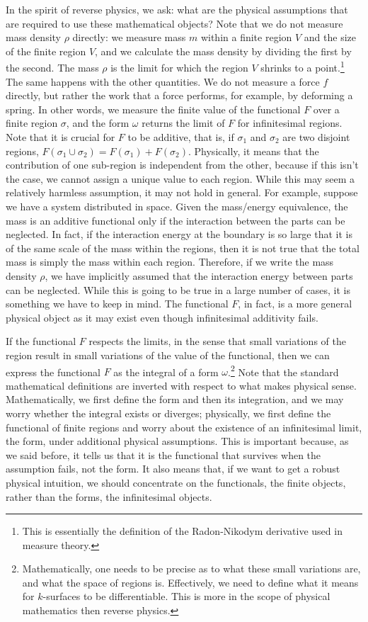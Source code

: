In the spirit of reverse physics, we ask: what are the physical assumptions that are required to use these mathematical objects? Note that we do not measure mass density $\rho$ directly: we measure mass $m$ within a finite region $V$ and the size of the finite region $V$, and we calculate the mass density by dividing the first by the second. The mass $\rho$  is the limit for which the region $V$ shrinks to a point.\footnote{This is essentially the definition of the Radon-Nikodym derivative used in measure theory.} The same happens with the other quantities. We do not measure a force $f$ directly, but rather the work that a force performs, for example, by deforming a spring. In other words, we measure the finite value of the functional $F$ over a finite region $\sigma$, and the form $\omega$ returns the limit of $F$ for infinitesimal regions. Note that it is crucial for $F$ to be additive, that is, if $\sigma_1$ and $\sigma_2$ are two disjoint regions, $F(\sigma_1 \cup \sigma_2) = F(\sigma_1) + F(\sigma_2)$. Physically, it means that the contribution of one sub-region is independent from the other, because if this isn't the case, we cannot assign a unique value to each region. While this may seem a relatively harmless assumption, it may not hold in general. For example, suppose we have a system distributed in space. Given the mass/energy equivalence, the mass is an additive functional only if the interaction between the parts can be neglected. In fact, if the interaction energy at the boundary is so large that it is of the same scale of the mass within the regions, then it is not true that the total mass is simply the mass within each region. Therefore, if we write the mass density $\rho$, we have implicitly assumed that the interaction energy between parts can be neglected. While this is going to be true in a large number of cases, it is something we have to keep in mind. The functional $F$, in fact, is a more general physical object as it may exist even though infinitesimal additivity fails.

If the functional $F$ respects the limits, in the sense that small variations of the region result in small variations of the value of the functional, then we can express the functional $F$ as the integral of a form $\omega$.\footnote{Mathematically, one needs to be precise as to what these small variations are, and what the space of regions is. Effectively, we need to define what it means for $k$-surfaces to be differentiable. This is more in the scope of physical mathematics then reverse physics.} Note that the standard mathematical definitions are inverted with respect to what makes physical sense. Mathematically, we first define the form and then its integration, and we may worry whether the integral exists or diverges; physically, we first define the functional of finite regions and worry about the existence of an infinitesimal limit, the form, under additional physical assumptions. This is important because, as we said before, it tells us that it is the functional that survives when the assumption fails, not the form. It also means that, if we want to get a robust physical intuition, we should concentrate on the functionals, the finite objects, rather than the forms, the infinitesimal objects.

